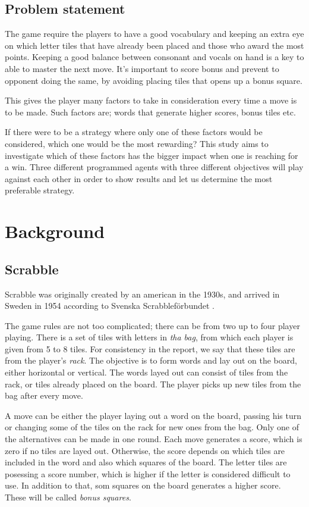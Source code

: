 \documentclass[a4paper, 12pt]{report}
\begin{document}
\section{Problem statement}
The game require the players to have a good vocabulary and keeping an extra eye on which letter tiles that have already been placed and those who award the most points. Keeping a good balance between consonant and vocals on hand is a key to able to master the next move. It’s important to score bonus and prevent to opponent doing the same, by avoiding placing tiles that opens up a bonus square.

This gives the player many factors to take in consideration every time a move is to be made. Such factors are; words that generate higher scores, bonus tiles etc.

If there were to be a strategy where only one of these factors would be considered, which one would be the most rewarding? This study aims to investigate which of these factors has the bigger impact when one is reaching for a win. Three different programmed agents with three different objectives will play against each other in order to show results and let us determine the most preferable strategy.


\chapter{Background}

\section{Scrabble}
Scrabble was originally created by an american in the 1930s, and arrived in Sweden in 1954 according to Svenska Scrabbleförbundet \cite{forbund}. 

The game rules are not too complicated; there can be from two up to four player playing. There is a set of tiles with letters in \emph{tha bag}, from which each player is given from 5 to 8 tiles. For consistency in the report, we say that these tiles are from the player's \emph{rack}. The objective is to form words and lay out on the board, either horizontal or vertical. The words layed out can consist of tiles from the rack, or tiles already placed on the board. The player picks up new tiles from the bag after every move.

A move can be either the player laying out a word on the board, passing his turn or changing some of the tiles on the rack for new ones from the bag. Only one of the alternatives can be made in one round. Each move generates a score, which is zero if no tiles are layed out. Otherwise, the score depends on which tiles are included in the word and also which squares of the board. The letter tiles are posessing a score number, which is higher if the letter is considered difficult to use. In addition to that, som squares on the board generates a higher score. These will be called \emph{bonus squares}. 
\end{document}
